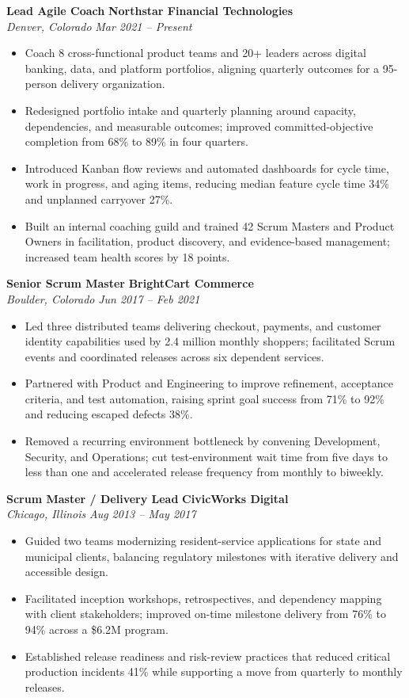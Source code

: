 \documentclass[10pt,letterpaper]{article}
\newcommand{\role}[4]{%
  \textbf{#1} \hfill \textbf{#2}\\[-1pt]
  \textit{#3} \hfill \textit{#4}\vspace{1pt}
}
\begin{document}
\role{Lead Agile Coach}{Northstar Financial Technologies}{Denver, Colorado}{Mar 2021 -- Present}
\begin{itemize}
  \item Coach 8 cross-functional product teams and 20+ leaders across digital banking, data, and platform portfolios, aligning quarterly outcomes for a 95-person delivery organization.
  \item Redesigned portfolio intake and quarterly planning around capacity, dependencies, and measurable outcomes; improved committed-objective completion from 68\% to 89\% in four quarters.
  \item Introduced Kanban flow reviews and automated dashboards for cycle time, work in progress, and aging items, reducing median feature cycle time 34\% and unplanned carryover 27\%.
  \item Built an internal coaching guild and trained 42 Scrum Masters and Product Owners in facilitation, product discovery, and evidence-based management; increased team health scores by 18 points.
\end{itemize}

\role{Senior Scrum Master}{BrightCart Commerce}{Boulder, Colorado}{Jun 2017 -- Feb 2021}
\begin{itemize}
  \item Led three distributed teams delivering checkout, payments, and customer identity capabilities used by 2.4 million monthly shoppers; facilitated Scrum events and coordinated releases across six dependent services.
  \item Partnered with Product and Engineering to improve refinement, acceptance criteria, and test automation, raising sprint goal success from 71\% to 92\% and reducing escaped defects 38\%.
  \item Removed a recurring environment bottleneck by convening Development, Security, and Operations; cut test-environment wait time from five days to less than one and accelerated release frequency from monthly to biweekly.
\end{itemize}

\role{Scrum Master / Delivery Lead}{CivicWorks Digital}{Chicago, Illinois}{Aug 2013 -- May 2017}
\begin{itemize}
  \item Guided two teams modernizing resident-service applications for state and municipal clients, balancing regulatory milestones with iterative delivery and accessible design.
  \item Facilitated inception workshops, retrospectives, and dependency mapping with client stakeholders; improved on-time milestone delivery from 76\% to 94\% across a \$6.2M program.
  \item Established release readiness and risk-review practices that reduced critical production incidents 41\% while supporting a move from quarterly to monthly releases.
\end{itemize}
\end{document}
